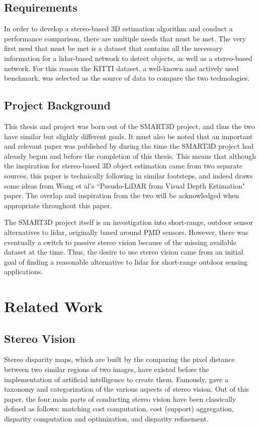 \subsection{Requirements}
In order to develop a stereo-based 3D estimation algorithm and conduct a performance comparison, there are multiple needs that must be met. The very first need that must be met is a dataset that contains all the necessary information for a lidar-based network to detect objects, as well as a stereo-based network. For this reason the KITTI dataset, a well-known and actively used benchmark, was selected as the source of data to compare the two technologies.


\subsection{Project Background}
This thesis and project was born out of the SMART3D project, and thus the two have similar but slightly different goals. It must also be noted that an important and relevant paper was published by \cite{wang_pseudo-lidar_2019} during the time the SMART3D project had already begun and before the completion of this thesis. This means that although the inspiration for stereo-based 3D object estimation came from two separate sources, this paper is technically following in similar footsteps, and indeed draws some ideas from Wang et al's ``Pseudo-LiDAR from Visual Depth Estimation" paper. The overlap and inspiration from the two will be acknowledged when appropriate throughout this paper. 

The SMART3D project itself is an investigation into short-range, outdoor sensor alternatives to lidar, originally based around PMD sensors. However, there was eventually a switch to passive stereo vision because of the missing available dataset at the time. Thus, the desire to use stereo vision came from an initial goal of finding a reasonable alternative to lidar for short-range outdoor sensing applications. 

\newpage
\section{Related Work} %

\subsection{Stereo Vision}
Stereo disparity maps, which are built by the comparing the pixel distance between two similar regions of two images, have existed before the implementation of artificial intelligence to create them. Famously, \cite{scharstein_taxonomy_2002} gave a taxonomy and categorization of the various aspects of stereo vision. Out of this paper, the four main parts of conducting stereo vision have been classically defined as follows: matching cost computation, cost (support) aggregation, disparity computation and optimization, and disparity refinement. 

